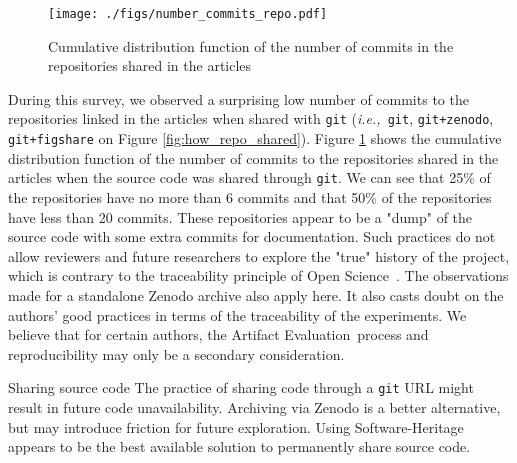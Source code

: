 \documentclass[sigconf,natbib=false]{acmart}
\newcommand{\ie}{\emph{i.e.,}}
\newcommand{\aeval}{Artifact Evaluation}
\newcommand{\todo}[1]{{\color{red}{TODO: #1}}}
\begin{document}

\begin{figure}
  \centering
  \texttt{[image: ./figs/number\_commits\_repo.pdf]}
  \caption{Cumulative distribution function of the number of commits in the repositories shared in the articles}\label{fig:number_commits_repo}
\end{figure}

During this survey, we observed a surprising low number of commits to the repositories linked in the articles when shared with \texttt{git} (\ie\ \texttt{git}, \texttt{git+zenodo}, \texttt{git+figshare} on Figure \ref{fig:how_repo_shared}).
Figure \ref{fig:number_commits_repo} shows the cumulative distribution function of the number of commits to the repositories shared in the articles when the source code was shared through \texttt{git}.
We can see that 25\% of the repositories have no more than 6 commits and that 50\% of the repositories have less than 20 commits.
These repositories appear to be a "dump" of the source code with some extra commits for documentation.
Such practices do not allow reviewers and future researchers to explore the "true" history of the project, which is contrary to the traceability principle of Open Science\ \cite{openscience_unesco}.
The observations made for a standalone Zenodo archive also apply here.
It also casts doubt on the authors' good practices in terms of the traceability of the experiments.
We believe that for certain authors, the \aeval\ process and reproducibility may only be a secondary consideration. 

\begin{lesson}{Sharing source code}{}
  The practice of sharing code through a \texttt{git} URL might result in future code unavailability.
  Archiving via Zenodo is a better alternative, but may introduce friction for future exploration.
  Using Software-Heritage appears to be the best available solution to permanently share source code.
\end{lesson}
\end{document}
